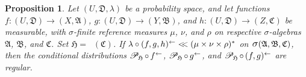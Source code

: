 \documentclass[
twoside=true,
paper=letter,
fontsize=9pt,
pagesize=auto,
leqno,
openany,
headsepline,
overfullrule,
]{scrbook}
\theoremstyle{plain}
\theoremstyle{plain}
\newtheorem{prop}[thm]{Proposition}
\theoremstyle{definition}
\theoremstyle{bfnoteitalic}
\theoremstyle{bfnoteroman}
\newcommand{\sigalg}[1]{\mathfrak{#1}}
\newcommand{\cali}[1]{\mathscr{#1}}
\newcommand{\condprobop}[1]{\mathop{\cali{P}\hspace{-1pt}}\nolimits_{#1}}
\newcommand{\sagb}{\mathop{\hbox{\large{$\sigma$}}}\nolimits}
\newcommand{\textsigma}{\hbox{\large{$\sigma$}}\kern-1pt}
\newcommand{\preimage}[1]{\mathop{#1^{\leftarrow}}}
\newcommand{\sigmaalgebra}{\sigalg{A}}
\newcommand{\sigmaalgebraii}{\sigalg{B}}
\newcommand{\sigmaalgebraiii}{\sigalg{C}}
\newcommand{\productsig}[2]{\sagb(#1,#2)}
\newcommand{\funcf}{f}
\newcommand{\funcg}{g}
\newcommand{\funch}{h}
\newcommand{\function}{f}
\newcommand{\functionii}{g}
\newcommand{\functioniii}{h}
\newcommand{\measurespace}{X}
\newcommand{\measurespaceii}{Y}
\newcommand{\measurespaceiii}{Z}
\newcommand{\abscont}{\mathrel{< \kern-3.5pt <}}
\newcommand{\measure}{\mu}
\newcommand{\measureii}{\nu}
\newcommand{\measureiii}{\lambda}
\newcommand{\measlambda}{\lambda}
\newcommand{\measureiv}{\rho}
\newcommand{\uspace}{U}%
\newcommand{\uspacesig}{\sigalg{D}}
\begin{document}
\begin{prop}\label{abs_cont_reg}
Let
$(\uspace,\uspacesig,\measlambda)$
be a probability space, and let functions
$\function:(\uspace,\uspacesig)\to (\measurespace,\sigmaalgebra)$,
$\functionii:(\uspace,\uspacesig)\to (\measurespaceii,\sigmaalgebraii)$,
and
$\functioniii:(\uspace,\uspacesig)\to (\measurespaceiii,\sigmaalgebraiii)$
be measurable, with \textsigma-finite reference measures
$\measure$, $\measureii$, and $\measureiv$ on respective \textsigma-algebras
$\sigmaalgebra$, $\sigmaalgebraii$, and $\sigmaalgebraiii$.
Set $\sigalg{H}=\preimage{\funch}(\sigmaalgebraiii)$.
If
$\measureiii\circ\preimage{(\function,\functionii,\functioniii)}
\abscont
(\measure\times\measureii\times\measureiv)^*$ on
$\productsig{\sigmaalgebra}{\sigmaalgebraii,\sigmaalgebraiii}$,
then the conditional distributions
$\condprobop{\sigalg{H}}\circ \preimage{\funcf}$,
$\condprobop{\sigalg{H}}\circ \preimage{\funcg}$,
and
$\condprobop{\sigalg{H}} \circ \preimage{(\funcf,\funcg)}$
are regular.
\end{prop}
\end{document}
